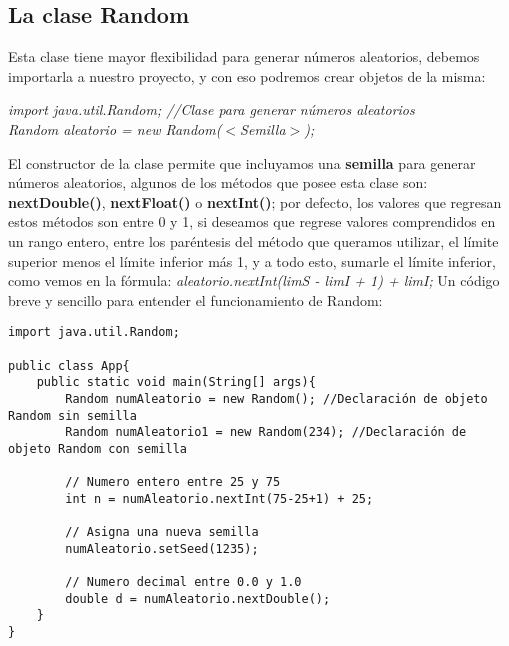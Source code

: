 \subsection{La clase Random}
Esta clase tiene mayor flexibilidad para generar números aleatorios, debemos importarla a nuestro proyecto, y con eso podremos crear objetos de la misma: \begin{center}\textit{import java.util.Random; //Clase para generar números aleatorios\\Random aleatorio = new Random($<$\textit{Semilla}$>$);}\end{center}
El constructor de la clase permite que incluyamos una \textbf{semilla} para generar números aleatorios, algunos de los métodos que posee esta clase son: \textbf{nextDouble()}, \textbf{nextFloat()} o \textbf{nextInt()}; por defecto, los valores que regresan estos métodos son entre 0 y 1, si deseamos que regrese valores comprendidos en un rango entero, entre los paréntesis del método que queramos utilizar, el límite superior menos el límite inferior más 1, y a todo esto, sumarle el límite inferior, como vemos en la fórmula: \textit{aleatorio.nextInt(limS - limI + 1) + limI;}
Un código breve y sencillo para entender el funcionamiento de Random:
\begin{lstlisting}
import java.util.Random;

public class App{
	public static void main(String[] args){
		Random numAleatorio = new Random(); //Declaración de objeto Random sin semilla
		Random numAleatorio1 = new Random(234); //Declaración de objeto Random con semilla

		// Numero entero entre 25 y 75
		int n = numAleatorio.nextInt(75-25+1) + 25;

		// Asigna una nueva semilla
		numAleatorio.setSeed(1235);

		// Numero decimal entre 0.0 y 1.0
		double d = numAleatorio.nextDouble();
	}
}
\end{lstlisting}


